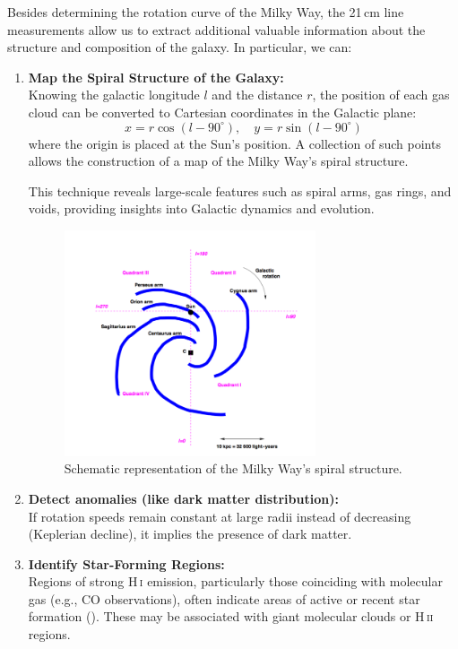 \documentclass[12pt,a4paper]{article}
\begin{document}
Besides determining the rotation curve of the Milky Way, the 21\,cm line measurements allow us to extract additional valuable information about the structure and composition of the galaxy. In particular, we can:

\begin{enumerate}
    \item \textbf{Map the Spiral Structure of the Galaxy:} \\
    Knowing the galactic longitude $l$ and the distance $r$, the position of each gas cloud can be converted to Cartesian coordinates in the Galactic plane:
\[
x = r \cos(l - 90^\circ), \quad y = r \sin(l - 90^\circ)
\]
where the origin is placed at the Sun’s position. A collection of such points allows the construction of a map of the Milky Way’s spiral structure.

This technique reveals large-scale features such as spiral arms, gas rings, and voids, providing insights into Galactic dynamics and evolution.
\begin{figure}[H]
  \centering
  \includegraphics[width=0.7\textwidth]{Pictures/spiral.png}
  \caption{Schematic representation of the Milky Way's spiral structure.}
  \label{fig:spiral}
\end{figure}
    \item \textbf{Detect anomalies (like dark matter distribution):} \\
    If rotation speeds remain constant at large radii instead of decreasing (Keplerian decline), it implies the presence of dark matter.
    
    \item \textbf{Identify Star-Forming Regions:} \\
    Regions of strong H\,\textsc{i} emission, particularly those coinciding with molecular gas (e.g., CO observations), often indicate areas of active or recent star formation (\cite{starform}). These may be associated with giant molecular clouds or H\,\textsc{ii} regions.

\end{enumerate}
\end{document}
